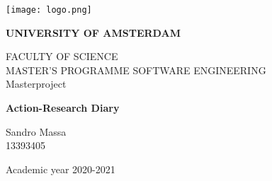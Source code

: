 \thispagestyle{empty}
\begin{titlepage}
  \begin{center}
    \texttt{[image: logo.png]}
  \end{center}
  \bfseries{
    \begin{center}
      \large
     \textbf{UNIVERSITY OF AMSTERDAM}\\
      \normalsize
      
      \vspace*{.5truecm}
      FACULTY OF SCIENCE\\
      \vspace*{.5truecm}
      MASTER'S PROGRAMME SOFTWARE ENGINEERING\\
      \vspace*{2truecm} \large
      Masterproject

     
        
      \LARGE
      \textbf{{Action-Research Diary}}\\



    \end{center}
    \vspace*{2.5truecm} \large
    \begin{flushleft}


      Sandro Massa\\
      13393405\\

    \end{flushleft}
    \vspace*{0.7truecm}
    \begin{center}
      Academic year 2020-2021
    \end{center} \clearpage
  }
\end{titlepage}
